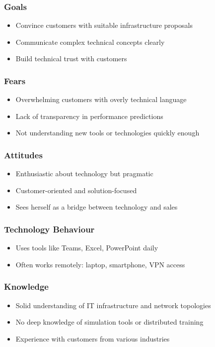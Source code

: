 \begin{flushleft}
    \subsubsection*{Goals}
    \begin{itemize}[leftmargin=*]
        \item Convince customers with suitable infrastructure proposals
        \item Communicate complex technical concepts clearly
        \item Build technical trust with customers
    \end{itemize}

    \subsubsection*{Fears}
    \begin{itemize}[leftmargin=*]
        \item Overwhelming customers with overly technical language
        \item Lack of transparency in performance predictions
        \item Not understanding new tools or technologies quickly enough
    \end{itemize}

    \subsubsection*{Attitudes}
    \begin{itemize}[leftmargin=*]
        \item Enthusiastic about technology but pragmatic
        \item Customer-oriented and solution-focused
        \item Sees herself as a bridge between technology and sales
    \end{itemize}

    \subsubsection*{Technology Behaviour}
    \begin{itemize}[leftmargin=*]
        \item Uses tools like Teams, Excel, PowerPoint daily
        \item Often works remotely: laptop, smartphone, VPN access
    \end{itemize}

    \subsubsection*{Knowledge}
    \begin{itemize}[leftmargin=*]
        \item Solid understanding of IT infrastructure and network topologies
        \item No deep knowledge of simulation tools or distributed training
        \item Experience with customers from various industries
    \end{itemize}


\end{flushleft}
